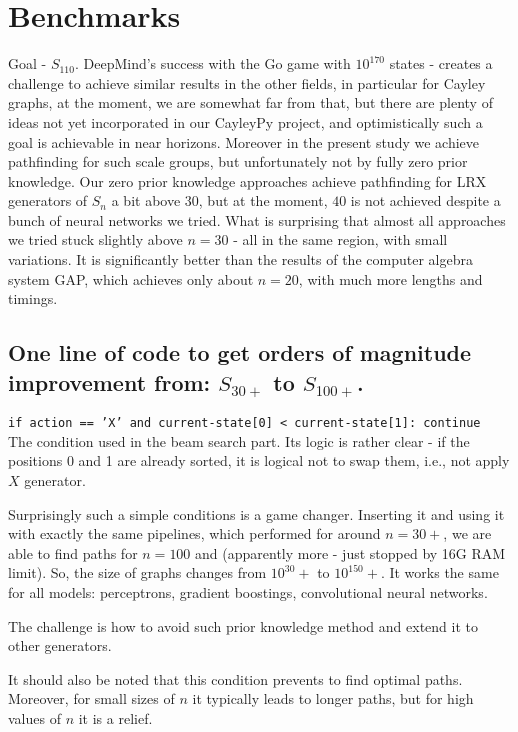 \documentclass[atmp]{ipart_v1}
\numberwithin{equation}{section}
\theoremstyle{plain}%
\begin{document}
\section{Benchmarks}

Goal - $S_{110}$. DeepMind's success with the Go game with $10^{170}$ states - creates a challenge to achieve similar results in the other fields, in particular for Cayley graphs, at the moment, we are somewhat far from that, but there are plenty of ideas not yet incorporated in our CayleyPy project, and optimistically such a goal is achievable in near horizons. Moreover in the present study we achieve pathfinding for such scale groups, but unfortunately not by fully zero prior knowledge. Our zero prior knowledge approaches achieve pathfinding for  LRX generators of $S_{n}$ a bit above $30$, but at the moment, $40$ is not achieved despite a bunch of neural networks we tried. What is surprising that almost all approaches we tried stuck slightly above $n=30$ - all in the same region, with small variations. It is significantly better than the results of the computer algebra system GAP, which achieves only about $n=20$, with much more lengths and timings. 

\subsection{One line of code to get orders of magnitude improvement from: $S_{30+}$ to $S_{100+}$. }

\texttt{if action == 'X' and current-state[0] < current-state[1]: continue }
The condition used in the beam search part. Its logic is rather clear - if the positions 0 and 1 are already sorted, it is logical not to swap them, i.e., not apply $X$ generator. 

Surprisingly such a simple conditions is a game changer. Inserting it and using it with exactly the same pipelines, which performed for around $n=30+$, we  are able to find paths for $n=100$ and (apparently more - just stopped by 16G RAM limit). So, the size of graphs changes from $10^30+$ to $10^150+$. It works the same for all models: perceptrons, gradient boostings, convolutional neural networks.  

The challenge is how to avoid such prior knowledge method and extend it to other generators.

It should also be noted that this condition prevents to find optimal paths. Moreover, for small sizes of $n$ it typically leads to longer paths, but for high values of $n$ it is a relief.
\end{document}
